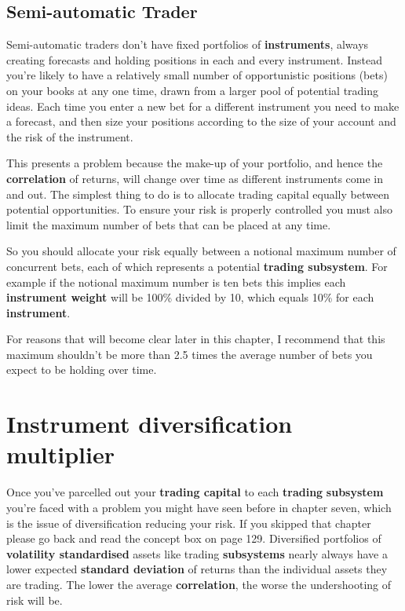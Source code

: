 \subsection*{Semi-automatic Trader}

Semi-automatic traders don't have fixed portfolios of \textbf{instruments}, always creating forecasts and holding positions in each and every instrument. Instead you're likely to have a relatively small number of opportunistic positions (bets) on your books at any one time, drawn from a larger pool of potential trading ideas. Each time you enter a new bet for a different instrument you need to make a forecast, and then size your positions according to the size of your account and the risk of the instrument.

This presents a problem because the make-up of your portfolio, and hence the \textbf{correlation} of returns, will change over time as different instruments come in and out. The simplest thing to do is to allocate trading capital equally between potential opportunities. To ensure your risk is properly controlled you must also limit the maximum number of bets that can be placed at any time.

So you should allocate your risk equally between a notional maximum number of concurrent bets, each of which represents a potential \textbf{trading subsystem}. For example if the notional maximum number is ten bets this implies each \textbf{instrument weight} will be 100\% divided by 10, which equals 10\% for each \textbf{instrument}.

For reasons that will become clear later in this chapter, I recommend that this maximum shouldn't be more than 2.5 times the average number of bets you expect to be holding over time.

\section*{Instrument diversification multiplier}  {}

Once you've parcelled out your \textbf{trading capital} to each \textbf{trading} \textbf{subsystem} you're faced with a problem you might have seen before in chapter seven, which is the issue of diversification reducing your risk. If you skipped that chapter please go back and read the concept box on page 129. Diversified portfolios of \textbf{volatility standardised} assets like trading \textbf{subsystems} nearly always have a lower expected \textbf{standard deviation} of returns than the individual assets they are trading. The lower the average \textbf{correlation}, the worse the undershooting of risk will be.

